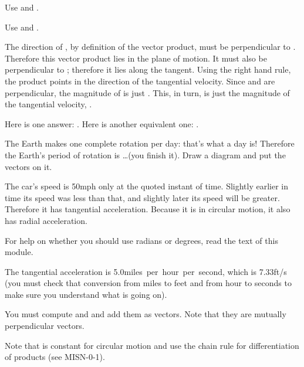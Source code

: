 {%
{\begin{one-digit-list}
 \item [a.] Use  and .
 \item [b.] Use  and .
 \end{one-digit-list}
}

%
{The direction of , by definition of the
 vector product, must be perpendicular to \vect{\omega}.
 Therefore this vector product lies in the plane of motion.
 It must also be perpendicular to ; therefore it lies along the
 tangent.
 Using the right hand rule, the product points in the direction of the
 tangential velocity.
 Since \vect{\omega} and  are perpendicular, the magnitude of
  is just .
 This, in turn, is just the magnitude of the tangential velocity, .
}

%
{Here is one answer: .
 Here is another equivalent one: .}

%
{The Earth makes one complete rotation per day: that's what a day is!
 Therefore the Earth's period of rotation  is \ldots (you finish it).
 Draw a diagram and put the vectors on it.
}

%
{The car's speed is 50\unit{mph} only at the quoted instant of time.
 Slightly earlier in time its speed was less than that, and slightly later
 its speed will be greater.
 Therefore it has tangential acceleration.
 Because it is in circular motion, it also has radial acceleration.
}

%
{For help on whether you should use radians or degrees, read the text of
 this module.
}

%
{The tangential acceleration is 5.0\unit{miles per hour per second}, which is
 7.33\unit{ft/s} (you must check that conversion from miles to feet and from
 hour to seconds to make sure you understand what is going on).
}

%
{You must compute  and  and add them as vectors.
 Note that they are mutually perpendicular vectors.
}

%
{Note that  is constant for circular motion and use the chain rule for
 differentiation of products (see MISN-0-1).
}

}
